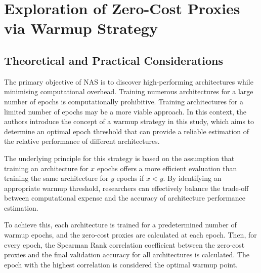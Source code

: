 \section{Exploration of Zero-Cost Proxies via Warmup Strategy}
\subsection{Theoretical and Practical Considerations}

The primary objective of \gls{NAS} is to discover high-performing architectures while minimising computational overhead. Training numerous architectures for a large number of epochs is computationally prohibitive. Training architectures for a limited number of epochs may be a more viable approach. In this context, the authors introduce the concept of a warmup strategy in this study, which aims to determine an optimal epoch threshold that can provide a reliable estimation of the relative performance of different architectures.

The underlying principle for this strategy is based on the assumption that training an architecture for $x$ epochs offers a more efficient evaluation than training the same architecture for $y$ epochs if $x < y$. By identifying an appropriate warmup threshold, researchers can effectively balance the trade-off between computational expense and the accuracy of architecture performance estimation.

To achieve this, each architecture is trained for a predetermined number of warmup epochs, and the zero-cost proxies are calculated at each epoch. Then, for every epoch, the Spearman Rank correlation coefficient between the zero-cost proxies and the final validation accuracy for all architectures is calculated. The epoch with the highest correlation is considered the optimal warmup point. 


